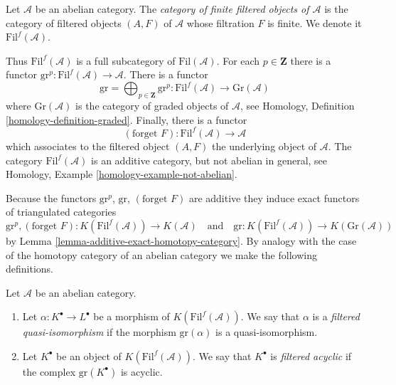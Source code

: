 \begin{definition}
\label{definition-finite-filtered}
Let $\mathcal{A}$ be an abelian category. The
{\it category of finite filtered objects of $\mathcal{A}$}
is the category of filtered objects
$(A, F)$ of $\mathcal{A}$ whose filtration $F$ is finite.
We denote it $\text{Fil}^f(\mathcal{A})$.
\end{definition}

\noindent
Thus $\text{Fil}^f(\mathcal{A})$ is a full subcategory of
$\text{Fil}(\mathcal{A})$. For each $p \in \mathbf{Z}$ there is
a functor
$\text{gr}^p : \text{Fil}^f(\mathcal{A}) \to \mathcal{A}$.
There is a functor
$$
\text{gr} = \bigoplus\nolimits_{p \in \mathbf{Z}} \text{gr}^p :
\text{Fil}^f(\mathcal{A}) \to \text{Gr}(\mathcal{A})
$$
where $\text{Gr}(\mathcal{A})$ is the category of graded objects of
$\mathcal{A}$, see Homology, Definition \ref{homology-definition-graded}.
Finally, there is a functor
$$
(\text{forget }F) : \text{Fil}^f(\mathcal{A}) \longrightarrow \mathcal{A}
$$
which associates to the filtered object $(A, F)$ the underlying object
of $\mathcal{A}$.
The category $\text{Fil}^f(\mathcal{A})$ is an additive category, but not
abelian in general, see
Homology, Example \ref{homology-example-not-abelian}.

\medskip\noindent
Because the functors $\text{gr}^p$, $\text{gr}$, $(\text{forget }F)$
are additive they induce exact functors of triangulated categories
$$
\text{gr}^p, (\text{forget }F) :
K(\text{Fil}^f(\mathcal{A}))
\to
K(\mathcal{A})
\quad\text{and}\quad
\text{gr} :
K(\text{Fil}^f(\mathcal{A}))
\to
K(\text{Gr}(\mathcal{A}))
$$
by
Lemma \ref{lemma-additive-exact-homotopy-category}.
By analogy with the case of the homotopy category of an abelian category
we make the following definitions.

\begin{definition}
\label{definition-filtered-acyclic}
Let $\mathcal{A}$ be an abelian category.
\begin{enumerate}
\item Let $\alpha : K^\bullet \to L^\bullet$ be a morphism of
$K(\text{Fil}^f(\mathcal{A}))$. We say that
$\alpha$ is a {\it filtered quasi-isomorphism} if
the morphism $\text{gr}(\alpha)$ is a quasi-isomorphism.
\item Let $K^\bullet$ be an object of $K(\text{Fil}^f(\mathcal{A}))$.
We say that $K^\bullet$ is {\it filtered acyclic} if
the complex $\text{gr}(K^\bullet)$ is acyclic.
\end{enumerate}
\end{definition}


